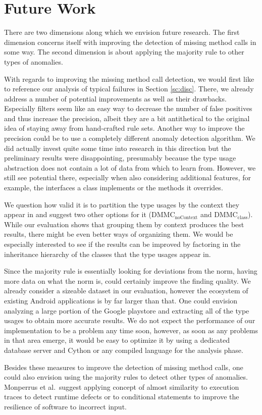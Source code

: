 \section{Future Work}

There are two dimensions along which we envision future research.
The first dimension concerns itself with improving the detection of missing method calls in some way.
The second dimension is about applying the majority rule to other types of anomalies.

With regards to improving the missing method call detection, we would first like to reference our analysis of typical failures in Section \ref{sc:disc}.
There, we already address a number of potential improvements as well as their drawbacks.
Especially filters seem like an easy way to decrease the number of false positives and thus increase the precision, albeit they are a bit antithetical to the original idea of staying away from hand-crafted rule sets.
Another way to improve the precision could be to use a completely different anomaly detection algorithm.
We did actually invest quite some time into research in this direction but the preliminary results were disappointing, presumably because the type usage abstraction does not contain a lot of data from which to learn from.
However, we still see potential there, especially when also considering additional features, for example, the interfaces a class implements or the methods it overrides.

We question how valid it is to partition the type usages by the context they appear in and suggest two other options for it ($\text{DMMC}_\text{noContext}$ and $\text{DMMC}_\text{class}$).
While our evaluation shows that grouping them by context produces the best results, there might be even better ways of organizing them.
We would be especially interested to see if the results can be improved by factoring in the inheritance hierarchy of the classes that the type usages appear in.

Since the majority rule is essentially looking for deviations from the norm, having more data on what the norm is, could certainly improve the finding quality.
We already consider a sizeable dataset in our evaluation, however the ecosystem of existing Android applications is by far larger than that.
One could envision analyzing a large portion of the Google playstore and extracting all of the type usages to obtain more accurate results.
We do not expect the performance of our implementation to be a problem any time soon, however, as soon as any problems in that area emerge, it would be easy to optimize it by using a dedicated database server and Cython or any compiled language for the analysis phase.

Besides these measures to improve the detection of missing method calls, one could also envision using the majority rules to detect other types of anomalies.
Monperrus et al.\ suggest applying concept of almost similarity to execution traces to detect runtime defects or to conditional statements to improve the resilience of software to incorrect input.

